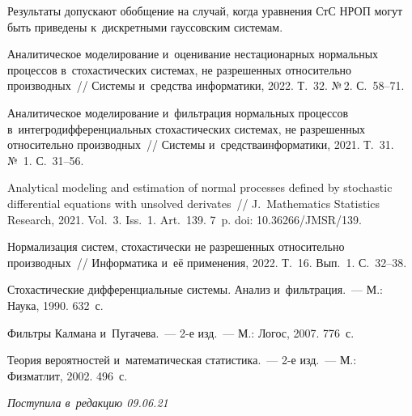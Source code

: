 \begin{multicols}{2}
Результаты допускают обобщение на случай, когда уравнения СтС  НРОП могут быть 
приведены к~дискретными гауссовским системам.


{\small\frenchspacing
 {%
 \begin{thebibliography}{9}
Аналитическое моделирование и~оценивание нестационарных нормальных процессов в~стохастических 
системах, не разрешенных относительно производных~// Системы и~средства информатики, 2022. Т.~32. 
 №\,2. С.~58--71.

Аналитическое моделирование и~фильт\-ра\-ция нормальных процессов в~интегродифференциальных 
стохастических системах, не разрешенных относительно производных~// Системы и~средства\linebreak информатики, 2021. 
Т.~31. №~1. С.~31--56.


Analytical modeling and estimation of normal processes defined by stochastic differential equations with unsolved 
derivates~// J.~Mathematics Statistics Research, 2021. Vol.~3. Iss.~1. Art.~139. 
7~p. doi: 10.36266/JMSR/139.


Нормализация систем, стохастически не разрешенных относительно производных~// 
Информатика и~её применения, 2022. Т.~16. Вып.~1. С.~32--38.



Стохастические дифференциальные системы. Анализ и~фильтрация.~--- М.:
Наука,  1990.  632~с. 

Фильтры Калмана и~Пугачева.~--- 2-е изд.~--- М.: Логос, 2007. 776~с.

Теория вероятностей и~математическая статистика.~--- 2-е изд.~--- М.: Физ\-мат\-лит, 2002. 496~с.
{

}

\end{thebibliography}

 }
 }

\end{multicols}

\vspace*{-14pt}

\hfill{\small\textit{Поступила в~редакцию 09.06.21}}

